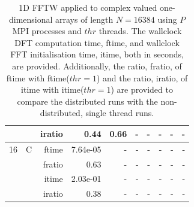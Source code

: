 \documentclass[a4paper]{article}
\begin{document}
\begin{table}[htbp]
\begin{center}
\begin{small}
\begin{tabular}{|r|r|r|r|r|r|r|r|r|r|}
          &      & iratio & 0.44 & 0.66 &     -     &     -     &     -     &     -     &     -     \\ \hline 
     16 & C & ftime & 7.64e-05 &     -     &     -     &     -     &     -     &     -     &     -     \\   
          &      & fratio & 0.63 &     -     &     -     &     -     &     -     &     -     &     -     \\   
          &      & itime & 2.03e-01 &     -     &     -     &     -     &     -     &     -     &     -     \\   
          &      & iratio & 0.38 &     -     &     -     &     -     &     -     &     -     &     -     \\ \hline 
\end{tabular}
\caption{1D FFTW applied to complex valued one-dimensional arrays of length $N=16384$ using $P$ MPI processes and $thr$ threads. The wallclock DFT computation time, ftime, and wallclock FFT initialisation time, itime, both in seconds, are provided. Additionally, the ratio, fratio, of ftime  with ftime($thr=1$) and the ratio, iratio, of itime  with itime($thr=1$) are provided to compare the distributed runs with the non-distributed, single thread runs.  }\label{TblFFT1d16384}
\end{small}
\end{center}
\end{table}
\end{document}
